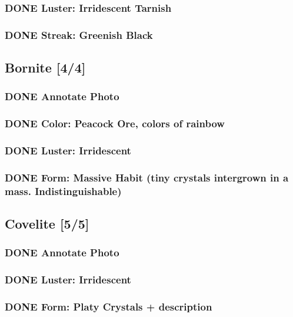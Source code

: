 \documentclass[11pt]{article}
\begin{document}
\subsubsection{{\bfseries\sffamily DONE} Luster: Irridescent Tarnish}
\label{sec-2-5-4}
\subsubsection{{\bfseries\sffamily DONE} Streak: Greenish Black}
\label{sec-2-5-5}
\subsection{Bornite [4/4]}
\label{sec-2-6}
\subsubsection{{\bfseries\sffamily DONE} Annotate Photo}
\label{sec-2-6-1}
\subsubsection{{\bfseries\sffamily DONE} Color: Peacock Ore, colors of rainbow}
\label{sec-2-6-2}
\subsubsection{{\bfseries\sffamily DONE} Luster: Irridescent}
\label{sec-2-6-3}
\subsubsection{{\bfseries\sffamily DONE} Form: Massive Habit (tiny crystals intergrown in a mass. Indistinguishable)}
\label{sec-2-6-4}
\subsection{Covelite [5/5]}
\label{sec-2-7}
\subsubsection{{\bfseries\sffamily DONE} Annotate Photo}
\label{sec-2-7-1}
\subsubsection{{\bfseries\sffamily DONE} Luster: Irridescent}
\label{sec-2-7-2}
\subsubsection{{\bfseries\sffamily DONE} Form: Platy Crystals + description}
\label{sec-2-7-3}
\end{document}
